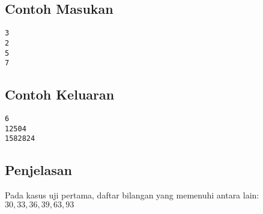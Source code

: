 \documentclass{article}
\begin{document}
\begin{multicols}{2}
\subsection*{Contoh Masukan}
\begin{lstlisting}
3
2
5
7
\end{lstlisting}
\columnbreak
\subsection*{Contoh Keluaran}
\begin{lstlisting}
6
12504
1582824
\end{lstlisting}
\vfill
\null
\end{multicols}

\subsection*{Penjelasan}
Pada kasus uji pertama, daftar bilangan yang memenuhi antara lain: $30, 33, 36, 39, 63, 93$

\pagebreak
\end{document}
